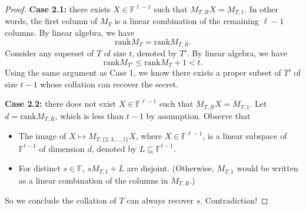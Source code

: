 \documentclass[10pt,a4paper]{amsart}
\newcommand{\rank}{\mathrm{rank}}
\begin{document}
\begin{proof}
\textbf{Case 2.1:} there exists $X \in \mathbb{F}^{\ell-1}$ such that $M_{T, R}X = M_{T, 1}$. In other words, the first column of $M_{T}$ is a linear combination of the remaining $\ell-1$ columns. By linear algebra, we have
\[
\rank M_{T} = \rank M_{T, R}.
\] 
Consider any superset of $T$ of size $t$, denoted by $T'$. By linear algebra, we have
\[
\rank M_{T'} \le \rank M_{T} + 1 < t.
\]
Using the same argument as Case 1, we know there exists a proper subset of $T'$ of size $t-1$ whose collation can recover the secret.

\textbf{Case 2.2:} there does not exist $X \in \mathbb{F}^{\ell-1}$ such that $M_{T, R}X = M_{T, 1}$. Let $d = \rank M_{T, R}$, which is less than $t-1$ by assumption. Observe that
\begin{itemize}
	\item The image of $X \mapsto M_{T, \{2, 3, \ldots, t\}} X$, where $X \in \mathbb{F}^{\ell-1}$, is a linear subspace of $\mathbb{F}^{t-1}$ of dimension $d$, denoted by $L \subseteq \mathbb{F}^{t-1}$.
	\item For distinct $s \in \mathbb{F}$, $sM_{T, 1} + L$ are disjoint. (Otherwise, $M_{T, 1}$ would be written as a linear combination of the columns in $M_{T, R}$.)
\end{itemize}
So we conclude the collation of $T$ can always recover $s$. Contradiction!
\end{proof}
\end{document}

